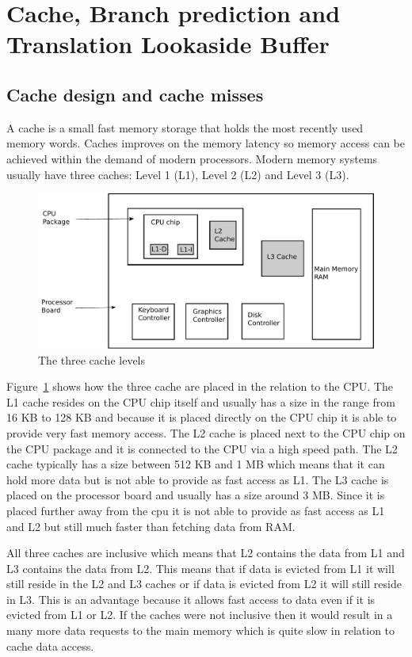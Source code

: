 \section{Cache, Branch prediction and Translation Lookaside Buffer}

\subsection{Cache design and cache misses}

A cache is a small fast memory storage that holds the most recently used memory words.
Caches improves on the memory latency so memory access can be achieved within the demand of modern processors.
Modern memory systems usually have three caches: Level 1 (L1), Level 2 (L2) and Level 3 (L3). \citep[Section~4.5.1]{Tanenbaum}

\begin{figure}
\includegraphics[width=\textwidth]{CacheLevels.pdf}
\caption{The three cache levels}
\label{fig:CacheLevels}
\end{figure}

Figure~\ref{fig:CacheLevels} shows how the three cache are placed in the relation to the CPU. 
The L1 cache resides on the CPU chip itself and usually has a size in the range from 16 KB to 128 KB and because it is placed directly on the CPU chip it is able to provide very fast memory access.
The L2 cache is placed next to the CPU chip on the CPU package and it is connected to the CPU via a high speed path. The L2 cache typically has a size between 512 KB and 1 MB which means that it can hold more data but is not able to provide as fast access as L1.
The L3 cache is placed on the processor board and usually has a size around 3 MB. Since it is placed further away from the cpu it is not able to provide as fast access as L1 and L2 but still much faster than fetching data from RAM.

All three caches are inclusive which means that L2 contains the data from L1 and L3 contains the data from L2.
This means that if data is evicted from L1 it will still reside in the L2 and L3 caches or if data is evicted from L2 it will still reside in L3. 
This is an advantage because it allows fast access to data even if it is evicted from L1 or L2. 
If the caches were not inclusive then it would result in a many more data requests to the main memory which is quite slow in relation to cache data access.

